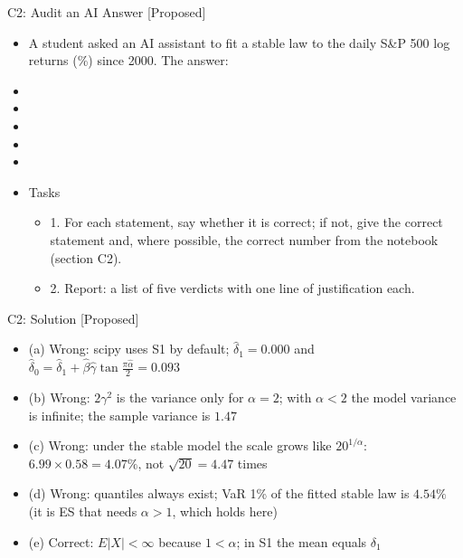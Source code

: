 \begin{frame}{C2: Audit an AI Answer [Proposed]}
\itemsize{\scriptsize}
\begin{itemize}
    \item A student asked an AI assistant to fit a stable law to the daily S\&P 500 log returns (\%) since 2000. The answer:
    \item {}
    \item {}
    \item {}
    \item {}
    \item {}
    \item Tasks
    \begin{itemize}
        \item 1. For each statement, say whether it is correct; if not, give the correct statement and, where possible, the correct number from the notebook (section C2).
        \item 2. Report: a list of five verdicts with one line of justification each.
    \end{itemize}
\end{itemize}
\end{frame}

\ifsolutions
\begin{frame}{C2: Solution [Proposed]}
\itemsize{\footnotesize}
\begin{itemize}
    \item (a) Wrong: scipy uses S1 by default; $\hat\delta_1 = 0.000$ and $\hat\delta_0 = \hat\delta_1 + \hat\beta\hat\gamma\tan\frac{\pi\hat\alpha}{2} = 0.093$
    \item (b) Wrong: $2\gamma^2$ is the variance only for $\alpha = 2$; with $\alpha < 2$ the model variance is infinite; the sample variance is $1.47$
    \item (c) Wrong: under the stable model the scale grows like $20^{1/\alpha}$: $6.99 \times 0.58 = 4.07\%$, not $\sqrt{20} = 4.47$ times
    \item (d) Wrong: quantiles always exist; VaR 1\% of the fitted stable law is $4.54\%$ (it is ES that needs $\alpha > 1$, which holds here)
    \item (e) Correct: $E|X| < \infty$ because $1 < \alpha$; in S1 the mean equals $\delta_1$
\end{itemize}
\end{frame}
\fi


